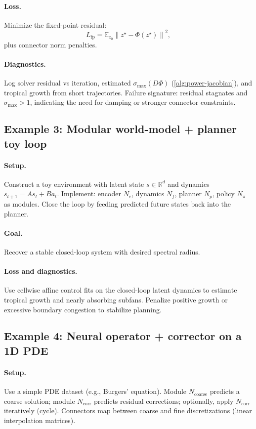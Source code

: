 \documentclass[11pt]{article}
\theoremstyle{definition}
\theoremstyle{plain}
\theoremstyle{remark}
\newcommand{\R}{\mathbb{R}}
\newcommand{\E}{\mathbb{E}}
\newcommand{\norm}[1]{\left\lVert #1 \right\rVert}
\begin{document}
\paragraph{Loss.}
Minimize the fixed-point residual:
\[
L_{\mathrm{fp}}=\E_{z_0}\norm{z^\star-\Phi(z^\star)}^2,
\]
plus connector norm penalties.

\paragraph{Diagnostics.}
Log solver residual vs iteration, estimated $\sigma_{\max}(D\Phi)$ (\cref{alg:power-jacobian}), and tropical growth from short trajectories.
Failure signature: residual stagnates and $\sigma_{\max}>1$, indicating the need for damping or stronger connector constraints.

\subsection{Example 3: Modular world-model + planner toy loop}
\paragraph{Setup.}
Construct a toy environment with latent state $s\in\R^d$ and dynamics $s_{t+1}=A s_t + B a_t$.
Implement:
encoder $N_e$, dynamics $N_f$, planner $N_p$, policy $N_\pi$ as modules.
Close the loop by feeding predicted future states back into the planner.

\paragraph{Goal.}
Recover a stable closed-loop system with desired spectral radius.

\paragraph{Loss and diagnostics.}
Use cellwise affine control fits on the closed-loop latent dynamics to estimate tropical growth and nearly absorbing subfans.
Penalize positive growth or excessive boundary congestion to stabilize planning.

\subsection{Example 4: Neural operator + corrector on a 1D PDE}
\paragraph{Setup.}
Use a simple PDE dataset (e.g., Burgers' equation).
Module $N_\mathrm{coarse}$ predicts a coarse solution; module $N_\mathrm{corr}$ predicts residual corrections; optionally, apply $N_\mathrm{corr}$ iteratively (cycle).
Connectors map between coarse and fine discretizations (linear interpolation matrices).
\end{document}
